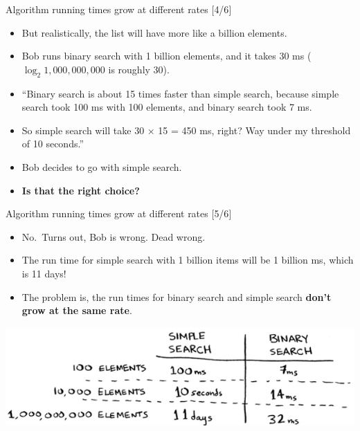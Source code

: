\documentclass[ignorenonframetext,]{beamer}
\providecommand{\tightlist}{%
  \setlength{\itemsep}{0pt}\setlength{\parskip}{0pt}}
\begin{document}
\begin{frame}{Algorithm running times grow at different rates {[}4/6{]}}
\protect\hypertarget{algorithm-running-times-grow-at-different-rates-46}{}

\begin{itemize}
\tightlist
\item
  But realistically, the list will have more like a billion elements.
\item
  Bob runs binary search with 1 billion elements, and it takes 30 ms
  (\(\log_2 1,000,000,000\) is roughly 30).
\item
  ``Binary search is about 15 times faster than simple search, because
  simple search took 100 ms with 100 elements, and binary search took 7
  ms.
\item
  So simple search will take 30 × 15 = 450 ms, right? Way under my
  threshold of 10 seconds.''
\item
  Bob decides to go with simple search.
\item
  \textbf{Is that the right choice?}
\end{itemize}

\end{frame}

\begin{frame}{Algorithm running times grow at different rates {[}5/6{]}}
\protect\hypertarget{algorithm-running-times-grow-at-different-rates-56}{}

\begin{itemize}
\tightlist
\item
  No.~Turns out, Bob is wrong. Dead wrong.
\item
  The run time for simple search with 1 billion items will be 1 billion
  ms, which is 11 days!
\item
  The problem is, the run times for binary search and simple search
  \textbf{don't grow at the same rate}.
\end{itemize}

\includegraphics{./Chapter01-figure/different_growth_rate.png}

\end{frame}
\end{document}
